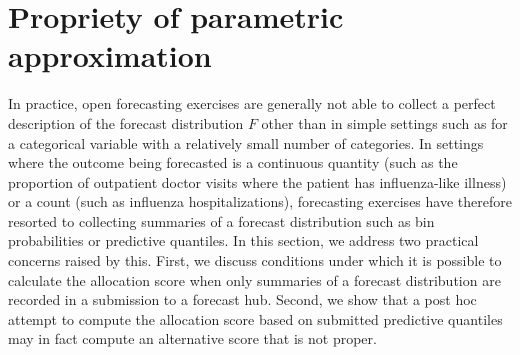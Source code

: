 \documentclass{article}
\begin{document}


\section{Propriety of parametric approximation} %
\label{sec:propriety_of_parametric_approximation}

In practice, open forecasting exercises are generally not able to collect a perfect description of the forecast distribution $F$ other than in simple settings such as for a categorical variable with a relatively small number of categories. In settings where the outcome being forecasted is a continuous quantity (such as the proportion of outpatient doctor visits where the patient has influenza-like illness) or a count (such as influenza hospitalizations), forecasting exercises have therefore resorted to collecting summaries of a forecast distribution such as bin probabilities or predictive quantiles.
In this section, we address two practical concerns raised by this. First, we discuss conditions under which it is possible to calculate the allocation score when only summaries of a forecast distribution are recorded in a submission to a forecast hub. Second, we show that a post hoc attempt to compute the allocation score based on submitted predictive quantiles may in fact compute an alternative score that is not proper.
\end{document}
